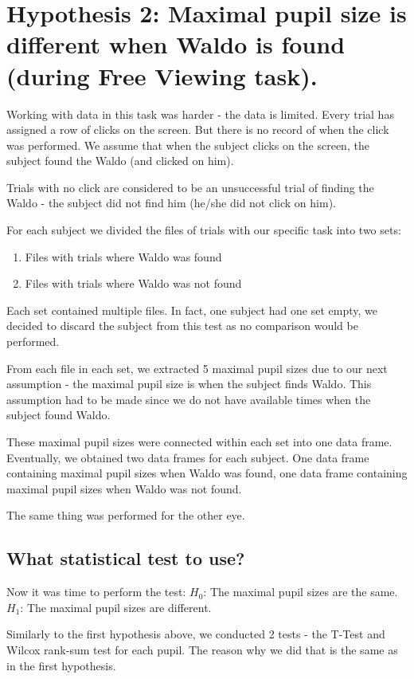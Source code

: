 \documentclass[a4paper]{article}
\begin{document}
\section{Hypothesis 2: Maximal pupil size is different when Waldo is found (during Free Viewing task).}

Working with data in this task was harder - the data is limited. Every trial has assigned a row of clicks on the screen. But there is no
record of when the click was performed. We assume that when the subject clicks on the screen, the subject found the Waldo (and clicked on him).

Trials with no click are considered to be an unsuccessful trial of finding the Waldo - the subject did not find him (he/she did not click on him).

For each subject we divided the files of trials with our specific task into two sets:
\begin{enumerate}
    \item Files with trials where Waldo was found
    \item Files with trials where Waldo was not found
\end{enumerate}

Each set contained multiple files. In fact, one subject had one set empty, we decided to discard the subject from this test as no comparison would be performed.

From each file in each set, we extracted 5 maximal pupil sizes due to our next assumption - the maximal pupil size is when the subject finds Waldo.
This assumption had to be made since we do not have available times when the subject found Waldo.

These maximal pupil sizes were connected within each set into one data frame. Eventually, we obtained two data frames for each subject.
One data frame containing maximal pupil sizes when Waldo was found, one data frame containing maximal pupil sizes when Waldo was not found.

The same thing was performed for the other eye.

\subsection{What statistical test to use?}

Now it was time to perform the test:
$H_0$: The maximal pupil sizes are the same.
$H_1$: The maximal pupil sizes are different.

Similarly to the first hypothesis above, we conducted 2 tests - the T-Test and Wilcox rank-sum test for each pupil. The reason why we did that is the
same as in the first hypothesis.
\end{document}
